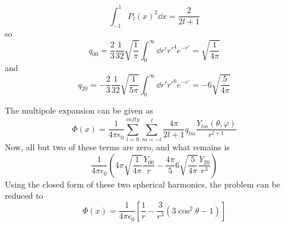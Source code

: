 \documentclass[a4paper,twoside]{article}
\begin{document}
\begin{tcolorbox}[breakable]
    \begin{equation}
        \int_{-1}^{1} P_l(x)^2\dd{x} = \frac{2}{2l + 1}
    \end{equation}
    so
    \begin{equation}
        q_{00} = \frac{2}{3} \frac{1}{32} \sqrt{\frac{1}{\pi}} \int_0^{\infty} \dd{r'} r'^{4} e^{-r'} = \sqrt{\frac{1}{4 \pi}}
    \end{equation}
    and
    \begin{equation}
        q_{20} = - \frac{2}{3} \frac{1}{32} \sqrt{\frac{1}{5 \pi}} \int_0^{\infty} \dd{r'} r'^6 e^{-r'} = -6 \sqrt{\frac{5}{4 \pi}}
    \end{equation}

    The multipole expansion can be given as
    \begin{equation}
        \Phi(x) = \frac{1}{4 \pi \epsilon_0} \sum_{l=0}^{infty} \sum_{m=-l}^{l} \frac{4 \pi}{2 l + 1} q_{lm} \frac{Y_{lm}(\theta, \varphi)}{r^{l+1}}
    \end{equation}
    Now, all but two of these terms are zero, and what remains is
    \begin{equation}
        \frac{1}{4 \pi \epsilon_0} \left( 4 \pi \sqrt{\frac{1}{4 \pi}} \frac{Y_{00}}{r} - \frac{4 \pi}{5} 6 \sqrt{\frac{5}{4 \pi}} \frac{Y_{20}}{r^3}\right)
    \end{equation}
    Using the closed form of these two spherical harmonics, the problem can be reduced to
    \begin{equation}
        \Phi(x) = \frac{1}{4 \pi \epsilon_0} \left[ \frac{1}{r} - \frac{3}{r^3} \left( 3\cos^2\theta - 1 \right) \right]
    \end{equation}
\end{tcolorbox}
\end{document}
